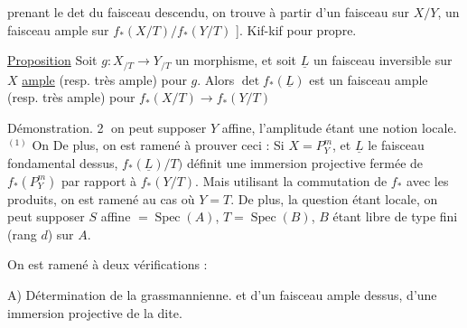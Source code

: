 
prenant le det du faisceau descendu, on trouve à partir d'un faisceau  sur $X/Y$, un faisceau ample sur $f_*(X/T)/f_*(Y/T)$ ]. Kif-kif pour propre.

\uline{Proposition} Soit $g:X_{/T}\to Y_{/T}$ un morphisme, et soit $\underline L$ un faisceau inversible sur $X$ \uline{ample}  (resp. très ample) pour $g$. Alors $\det f_*(\underline L)$ est un faisceau ample (resp. très ample) pour $f_*(X/T)\longrightarrow f_*(Y/T)$

Démonstration. \textcircled{2} on peut supposer $Y$ affine,  l'amplitude  étant une notion locale. $^{(1)}$ On   De plus, on est ramené à prouver ceci : Si $X=P^m_Y$, et $\underline L$ le faisceau fondamental dessus,  $f_*(\underline L)/T)$  définit une immersion projective fermée de $f_*(P^m_Y)$ par rapport à $f_*(Y/T)$. Mais utilisant la commutation de $f_*$ avec les produits, on est ramené au cas où $Y=T$. De plus, la question étant locale, on peut supposer $S$ affine $=\operatorname{Spec}(A)$, $T=\operatorname{Spec}(B)$, $B$ étant libre de type fini (rang $d$) sur $A$.



On est ramené  à deux vérifications :

A) Détermination de la grassmannienne. et d'un faisceau ample dessus,  d'une immersion projective de la dite.


